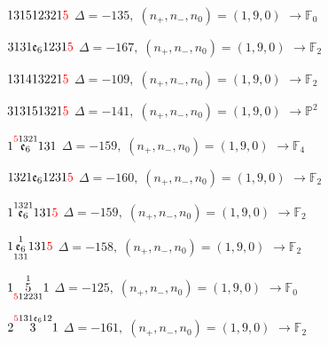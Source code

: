 \documentclass[10pt]{article}
\begin{document}
$131512321\textcolor{red}{5}$ \quad $\Delta=-135,\; (n_+,n_-,n_0)=(1,9,0)$ \quad $\to \mathbb{F}_{0}$

\smallskip

$3131\mathfrak{e}_61231\textcolor{red}{5}$ \quad $\Delta=-167,\; (n_+,n_-,n_0)=(1,9,0)$ \quad $\to \mathbb{F}_{2}$

\smallskip

$131413221\textcolor{red}{5}$ \quad $\Delta=-109,\; (n_+,n_-,n_0)=(1,9,0)$ \quad $\to \mathbb{F}_{2}$

\smallskip

$313151321\textcolor{red}{5}$ \quad $\Delta=-141,\; (n_+,n_-,n_0)=(1,9,0)$ \quad $\to \mathbb{P}^2$

\smallskip

$1\overset{\textcolor{red}{5}1321}{\mathfrak{e}_6}131$ \quad $\Delta=-159,\; (n_+,n_-,n_0)=(1,9,0)$ \quad $\to \mathbb{F}_{4}$

\smallskip

$1321\mathfrak{e}_61231\textcolor{red}{5}$ \quad $\Delta=-160,\; (n_+,n_-,n_0)=(1,9,0)$ \quad $\to \mathbb{F}_{2}$

\smallskip

$1\overset{1321}{\mathfrak{e}_6}131\textcolor{red}{5}$ \quad $\Delta=-159,\; (n_+,n_-,n_0)=(1,9,0)$ \quad $\to \mathbb{F}_{2}$

\smallskip

$1\overset{1}{\underset{131}{\mathfrak{e}_6}}131\textcolor{red}{5}$ \quad $\Delta=-158,\; (n_+,n_-,n_0)=(1,9,0)$ \quad $\to \mathbb{F}_{2}$

\smallskip

$1\overset{1}{\underset{\textcolor{red}{5}12231}{5}}1$ \quad $\Delta=-125,\; (n_+,n_-,n_0)=(1,9,0)$ \quad $\to \mathbb{F}_{0}$

\smallskip

$2\overset{\textcolor{red}{5}131\mathfrak{e}_612}{3}1$ \quad $\Delta=-161,\; (n_+,n_-,n_0)=(1,9,0)$ \quad $\to \mathbb{F}_{2}$
\end{document}
